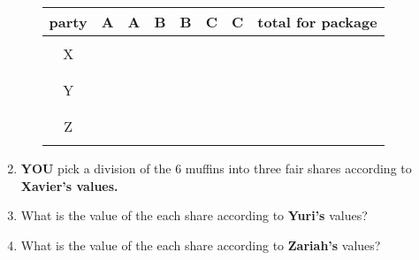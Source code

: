 \documentclass[12pt]{article}
\begin{document}
\begin{enumerate}
\begin{enumerate}
	\begin{tabular}{c || c | c| c| c | c| c| c}
	party&\quad A \quad  \quad&\quad A \quad  \quad&\quad B \quad\quad&\quad B \quad\quad&\quad C\quad\quad&\quad C\quad\quad&total for package\\
	\hline\hline
	&&&&&&\\
	X&&&&&&\\
	&&&&&& \\
	\hline
	&&&&&& \\
	Y&&&&&&\\
	&&&&&& \\
	\hline
	&&&&&& \\
	Z&&&&&&\\
	&&&&&& \\
	\end{tabular}
	\end{enumerate}
\item \textbf{YOU} pick a division of the 6 muffins into three fair shares according to \textbf{Xavier's values.}
\vfill
\item What is the value of the each share according to \textbf{Yuri's} values?\\
\vfill  
\item What is the value of the each share according to \textbf{Zariah's} values?\\
\vfill  
\end{enumerate}
\end{document}
